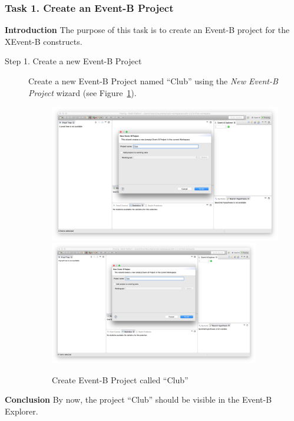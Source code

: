 \subsubsection{Task 1. Create an Event-B Project}\label{CreateProject}
\textbf{Introduction} The purpose of this task is to create an Event-B project for the XEvent-B constructs. 
\begin{description}
\item[Step 1. Create a new Event-B Project] Create a new Event-B Project named ``Club'' using the \emph{New Event-B Project} wizard (see Figure~\ref{fig:CreateProject}).
\begin{figure}[!htbp]
  \centering
  \ifplastex
  \includegraphics[width=512]{figures/CreateProject}
  \else
  \includegraphics[width=0.9\textwidth]{figures/CreateProject}
  \fi
  \caption{Create Event-B Project called ``Club''}
  \label{fig:CreateProject}
\end{figure}

\end{description}
\textbf{Conclusion} By now, the project ``Club'' should be visible in the Event-B Explorer.


